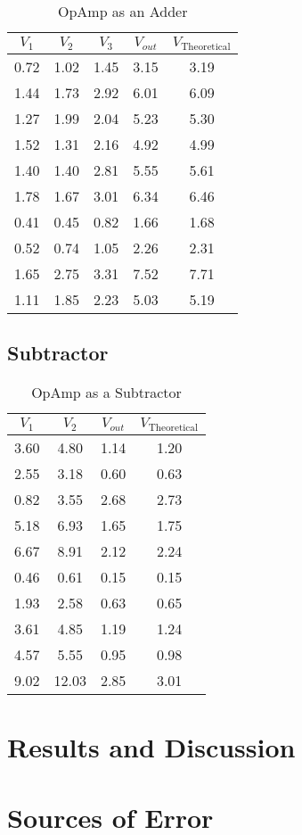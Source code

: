 \documentclass[12pt]{article}
\begin{document}
\begin{table}[H]
    \centering
    \begin{tabular}{|c|c|c|c|c|}
        \hline
        $V_1$ & $V_2$ & $V_3$ & $V_{out}$ & $V_\text{{Theoretical}}$ \\
        \hline
        0.72 & 1.02 & 1.45 & 3.15 & 3.19 \\
        1.44 & 1.73 & 2.92 & 6.01 & 6.09 \\
        1.27 & 1.99 & 2.04 & 5.23 & 5.30 \\
        1.52 & 1.31 & 2.16 & 4.92 & 4.99 \\
        1.40 & 1.40 & 2.81 & 5.55 & 5.61 \\
        1.78 & 1.67 & 3.01 & 6.34 & 6.46 \\
        0.41 & 0.45 & 0.82 & 1.66 & 1.68 \\
        0.52 & 0.74 & 1.05 & 2.26 & 2.31 \\
        1.65 & 2.75 & 3.31 & 7.52 & 7.71 \\
        1.11 & 1.85 & 2.23 & 5.03 & 5.19 \\
        \hline
    \end{tabular}
    \caption{OpAmp as an Adder}
    \label{tab:voltage_data_adder}
\end{table}


\subsection*{Subtractor}

\begin{table}[H]
  \centering
  \begin{tabular}{|c|c|c|c|}
      \hline
      $V_1$ & $V_2$ & $V_{out}$ & $V_{\text{Theoretical}}$ \\
      \hline
      3.60 & 4.80  & 1.14  & 1.20 \\
      2.55 & 3.18  & 0.60  & 0.63 \\
      0.82 & 3.55  & 2.68  & 2.73 \\
      5.18 & 6.93  & 1.65  & 1.75 \\
      6.67 & 8.91  & 2.12  & 2.24 \\
      0.46 & 0.61  & 0.15  & 0.15 \\
      1.93 & 2.58  & 0.63  & 0.65 \\
      3.61 & 4.85  & 1.19  & 1.24 \\
      4.57 & 5.55  & 0.95  & 0.98 \\
      9.02 & 12.03 & 2.85  & 3.01 \\
      \hline
  \end{tabular}
  \caption{OpAmp as a Subtractor}
  \label{tab:voltage_data2}
\end{table}

\section{Results and Discussion}
\section{Sources of Error}
\end{document}
